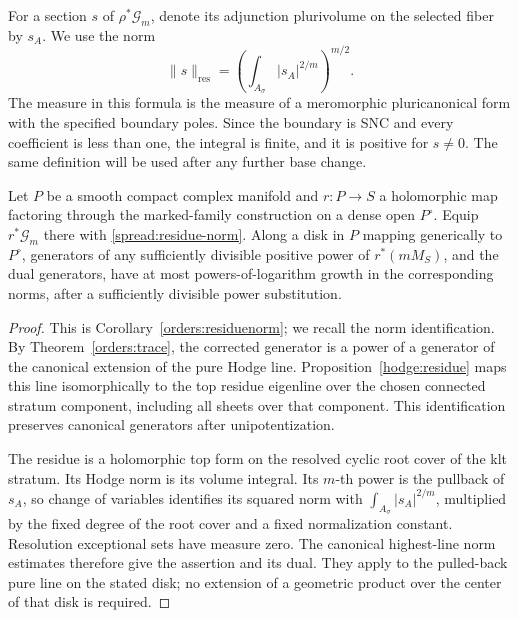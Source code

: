 For a section \(s\) of \(\rho^*\mathcal G_m\), denote its adjunction
plurivolume on the selected fiber by \(s_A\).  We use the norm
\begin{equation}\label{spread:residue-norm}
 \|s\|_{\mathrm{res}}
   =\left(\int_{A_\sigma}|s_A|^{2/m}\right)^{m/2}.
\end{equation}
The measure in this formula is the measure of a meromorphic
pluricanonical form with the specified boundary poles.
Since the boundary is SNC and every coefficient is less than one,
the integral is finite, and it is positive for \(s\ne0\).
The same definition will be used after any further base change.

\begin{lemma}\label{spread:residue-growth}
Let \(P\) be a smooth compact complex manifold and \(r:P\to S\) a
holomorphic map factoring through the marked-family construction
on a dense open \(P^\circ\).
Equip \(r^*\mathcal G_m\) there with
\eqref{spread:residue-norm}.  Along a disk in \(P\) mapping generically
to \(P^\circ\), generators of any sufficiently divisible positive
power of \(r^*(mM_S)\), and the dual generators, have at most
powers-of-logarithm growth in the corresponding norms, after a
sufficiently divisible power substitution.
\end{lemma}

\begin{proof}
This is Corollary~\ref{orders:residuenorm}; we recall the norm
identification.  By Theorem~\ref{orders:trace}, the corrected generator
is a power of a generator of the canonical extension of the pure Hodge line.
Proposition~\ref{hodge:residue} maps this line isomorphically to the
top residue eigenline over the chosen connected stratum component,
including all sheets over that component.  This identification
preserves canonical generators after unipotentization.

The residue is a holomorphic top form on the resolved cyclic root
cover of the klt stratum.  Its Hodge norm is its volume integral.
Its \(m\)-th power is the pullback of \(s_A\), so change of variables
identifies its squared norm with
\(\int_{A_\sigma}|s_A|^{2/m}\), multiplied by the fixed degree of the
root cover and a fixed normalization constant.  Resolution exceptional
sets have measure zero.  The canonical highest-line norm estimates
therefore give the assertion and its dual.  They apply to the
pulled-back pure line on the stated disk; no extension of a geometric
product over the center of that disk is required.
\end{proof}

